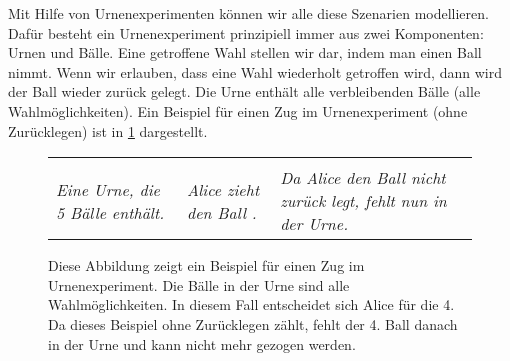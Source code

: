 \documentclass[../../main.tex]{subfiles}
\begin{document}
    Mit Hilfe von Urnenexperimenten können wir alle diese Szenarien modellieren. Dafür besteht ein Urnenexperiment prinzipiell immer aus zwei Komponenten: Urnen und Bälle. Eine getroffene Wahl stellen wir dar, indem man einen Ball nimmt. Wenn wir erlauben, dass eine Wahl wiederholt getroffen wird, dann wird der Ball wieder zurück gelegt. Die Urne enthält alle verbleibenden Bälle (alle Wahlmöglichkeiten). Ein Beispiel für einen Zug im Urnenexperiment (ohne Zurücklegen) ist in \cref{fig:urne_notation} dargestellt.
    
    \begin{figure}[ht]
        \centering
        \begin{tabularx}{\linewidth}{YYY}
             & 
             & 
            \\
            \raggedright\small\itshape Eine Urne, die 5 Bälle enthält. &
            \raggedright\small\itshape Alice zieht den Ball {\normalfont\orangeball}. &
            \raggedright\small\itshape Da Alice den Ball nicht zurück legt, fehlt {\normalfont\orangeball} nun in der Urne.
        \end{tabularx}
        \caption{Diese Abbildung zeigt ein Beispiel für einen Zug im Urnenexperiment. Die Bälle in der Urne sind alle Wahlmöglichkeiten. In diesem Fall entscheidet sich Alice für die 4. Da dieses Beispiel ohne Zurücklegen zählt, fehlt der 4. Ball danach in der Urne und kann nicht mehr gezogen werden.}
        \label{fig:urne_notation}
    \end{figure}
    
\end{document}
